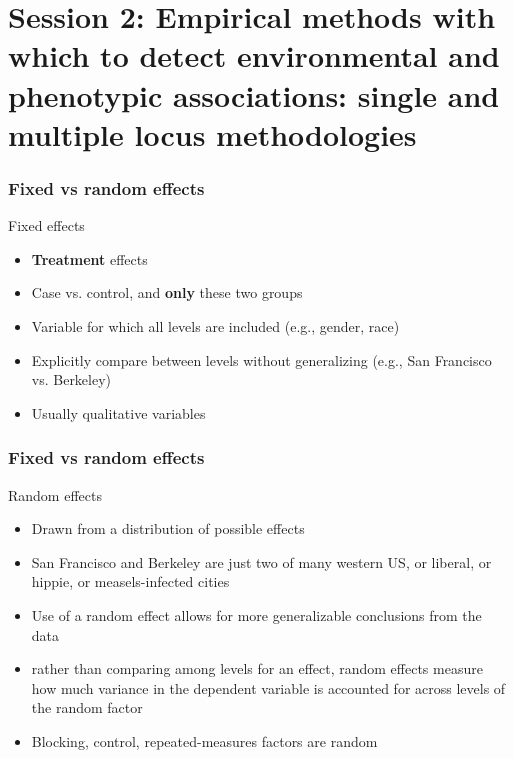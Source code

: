 
\section[Session 2]{Session 2: Empirical methods with which to detect
environmental and phenotypic associations: single and multiple locus
methodologies}

\begin{frame}
\frametitle{Fixed vs random effects}
\begin{block}{Fixed effects}
\begin{itemize}
\item{\textbf{Treatment} effects}
\item{Case vs. control, and \textbf{only} these two groups}
\item{Variable for which all levels are included (e.g., gender, race)}
\item{Explicitly compare between levels without generalizing (e.g., San
Francisco vs. Berkeley)}
\item{Usually qualitative variables}
\end{itemize}
\end{block}
\tiny
\citet{StroupFreund200203}
\end{frame}


\begin{frame}
\frametitle{Fixed vs random effects}
\begin{block}{Random effects}
\begin{itemize}
\item{Drawn from a distribution of possible effects}
\item{San Francisco and Berkeley are just two of many western US, 
or liberal, or hippie, or measels-infected cities}
\item{Use of a random effect allows for more generalizable conclusions 
from the data}
\item{rather than comparing among levels for an effect, random 
effects measure how much variance in the dependent variable is 
accounted for across levels of the random factor}
\item{Blocking, control, repeated-measures factors are random}
\end{itemize}
\end{block}
\tiny
\citet{StroupFreund200203}
\end{frame}



